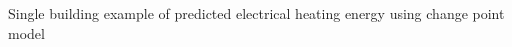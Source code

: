 Single building example of predicted electrical heating energy using change point model
\label{fig:heating_single}